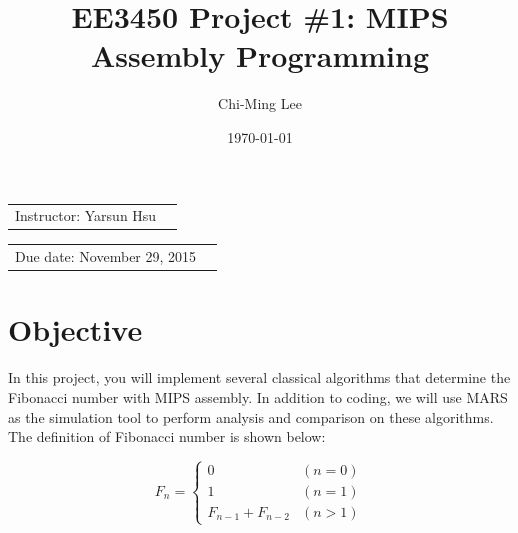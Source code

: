 \documentclass{article}
\title{EE3450 Project \#1: MIPS Assembly Programming} %
\author{Chi-Ming Lee} %
\date{\today} %
\begin{document}
\maketitle %

\begin{center}
\begin{tabular}{l r}
    Instructor: Yarsun Hsu
\end{tabular}
\end{center}

\begin{center}
\begin{tabular}{l r}
Due date: November 29, 2015 %
\end{tabular}
\end{center}



\section{Objective}

In this project, you will implement several classical algorithms that determine the Fibonacci number\cite{fibref} with MIPS assembly. 
In addition to coding, we will use MARS\cite{marsref} as the simulation tool to perform analysis and comparison on these algorithms.
The definition of Fibonacci number is shown below:

\begin{equation*}
    F_{n} = 
    \begin{cases}
        0 & (n = 0)\\
        1 & (n = 1)\\
        F_{n-1}+F_{n-2} & (n > 1)
    \end{cases}
\end{equation*}
\end{document}
